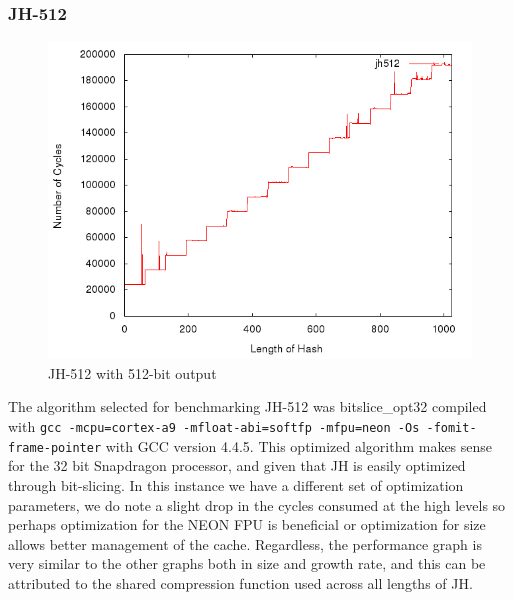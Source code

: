 \subsubsection{JH-512}
\begin{figure}[H]
    \begin{center}
        \includegraphics[scale=0.5]{images/jh512.png} 
        \caption{JH-512 with 512-bit output}
    \end{center}
\end{figure}

The algorithm selected for benchmarking JH-512 was bitslice\_opt32 compiled with
\texttt{gcc -mcpu=cortex-a9 -mfloat-abi=softfp -mfpu=neon -Os -fomit- \\
frame-pointer} with GCC version 4.4.5. This optimized algorithm makes sense for
the 32 bit Snapdragon processor, and given that JH is easily optimized through
bit-slicing. In this instance we have a different set of optimization
parameters, we do note a slight drop in the cycles consumed at the high levels
so perhaps optimization for the NEON FPU is beneficial or optimization for size
allows better management of the cache. Regardless, the performance graph is very
similar to the other graphs both in size and growth rate, and this can be
attributed to the shared compression function used across all lengths of JH.
